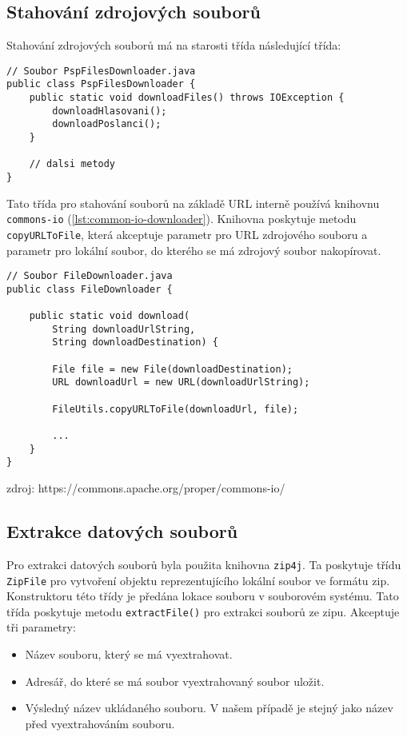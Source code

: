 \subsection{Stahování zdrojových souborů}
Stahování zdrojových souborů má na starosti třída následující třída:

\begin{lstlisting}[caption={Třída pro stahování zdrojových souborů}, label={lst:psp-downloader}, tabsize=2]
// Soubor PspFilesDownloader.java
public class PspFilesDownloader {
	public static void downloadFiles() throws IOException {
		downloadHlasovani();
		downloadPoslanci();
	}

	// dalsi metody
}
\end{lstlisting}

\noindent Tato třída pro stahování souborů na základě URL interně používá knihovnu \lstinline|commons-io| (\ref{lst:common-io-downloader}). Knihovna poskytuje metodu \lstinline|copyURLToFile|, která akceptuje parametr pro URL zdrojového souboru a parametr pro lokální soubor, do kterého se má zdrojový soubor nakopírovat.

\begin{lstlisting}[caption={Ukázka stahování dat pomocí knihovny \lstinline|commons-io|}, label={lst:common-io-downloader}, tabsize=2]
// Soubor FileDownloader.java
public class FileDownloader {
	
	public static void download(
		String downloadUrlString, 
		String downloadDestination) {
		
		File file = new File(downloadDestination);
		URL downloadUrl = new URL(downloadUrlString);
		
		FileUtils.copyURLToFile(downloadUrl, file);
	
		...
	}
}
\end{lstlisting}

zdroj: https://commons.apache.org/proper/commons-io/

\subsection{Extrakce datových souborů}
Pro extrakci datových souborů byla použita knihovna \lstinline|zip4j|. Ta poskytuje třídu \lstinline|ZipFile| pro vytvoření objektu reprezentujícího lokální soubor ve formátu zip. Konstruktoru této třídy je předána lokace souboru v souborovém systému. Tato třída poskytuje metodu \lstinline|extractFile()| pro extrakci souborů ze zipu. Akceptuje tři parametry:

\begin{itemize}
	\item Název souboru, který se má vyextrahovat.
	\item Adresář, do které se má soubor vyextrahovaný soubor uložit.
	\item Výsledný název ukládaného souboru. V našem případě je stejný jako název před vyextrahováním souboru.
\end{itemize}


